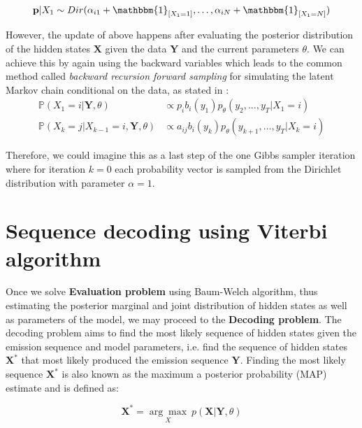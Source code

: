 \begin{equation}
    \textbf{p}|X_1 \sim Dir(\alpha_{i1} + \mathbbm{1}_{[X_1=1]},\ldots,\alpha_{iN} + \mathbbm{1}_{[X_1=N]})
\end{equation}

However, the update of above happens after evaluating the posterior distribution of the hidden states $\textbf{X}$ given the data $\textbf{Y}$ and the current parameters $\theta$.
We can achieve this by again using the backward variables which leads to the common method called \textit{backward recursion forward sampling} for simulating the 
latent Markov chain conditional on the data, as stated in \citep{Chib1996}:
\begin{align}
    \mathbb{P}(X_1=i|\textbf{Y},\theta) & \propto p_i b_i(y_1) p_{\theta}(y_2,\ldots,y_T|X_1=i) \\
    \mathbb{P}(X_k=j|X_{k-1}=i,\textbf{Y},\theta) & \propto a_{ij} b_i(y_k) p_{\theta}(y_{k+1},\ldots,y_T|X_k=i)
\end{align}

Therefore, we could imagine this as a last step of the one Gibbs sampler iteration where for iteration $k=0$ each probability vector is sampled from the Dirichlet distribution
with parameter $\alpha=1$.


\section{Sequence decoding using Viterbi algorithm}

Once we solve \textbf{Evaluation problem} using Baum-Welch algorithm, thus estimating the posterior marginal and joint distribution of hidden states as well as parameters of the model,
we may proceed to the \textbf{Decoding problem}. The decoding problem aims to find the most likely sequence of hidden states given the emission sequence and model parameters, i.e. 
find the sequence of hidden states $\textbf{X}^*$ that most likely produced the emission sequence $\textbf{Y}$. Finding the most likely sequence $\textbf{X}^*$ is also known as 
the maximum a posterior probability (MAP) estimate and is defined as:

\begin{equation} \label{eq:MAP}
    \textbf{X}^* = \underset{X}{\arg\max} \: p(\textbf{X}|\textbf{Y},\theta)
\end{equation}

